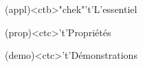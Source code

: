 \documentclass[../../main/main.tex]{subfiles}
\begin{document}
\vspace*{\fill}
\begin{tcn}[sidebyside, fontupper=\small, fontlower=\small](appl)<ctb>"chek"'t'{L'essentiel}
	\begin{tcn}(prop)<ctc>'t'{Propriétés}
	\end{tcn}
	\begin{tcn}(demo)<ctc>'t'{Démonstrations}

\end{tcn}
\end{tcn}
\end{document}
